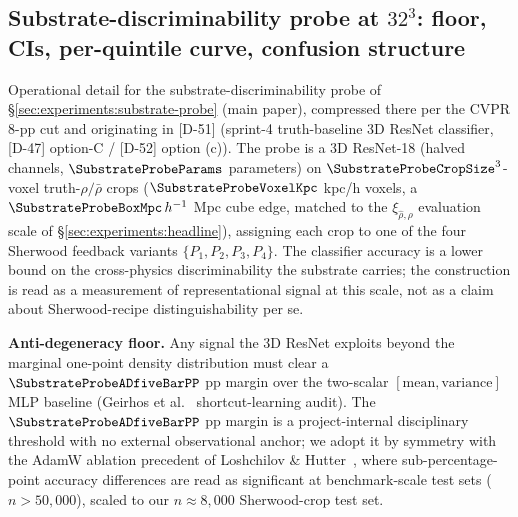 \subsection{Substrate-discriminability probe at $32^3$: floor, CIs, per-quintile curve, confusion structure}
\label{sec:suppl:exp:substrate-probe-32cube}
Operational detail for the substrate-discriminability probe of \S\ref{sec:experiments:substrate-probe} (main paper), compressed there per the CVPR 8-pp cut and originating in [D-51] (sprint-4 truth-baseline 3D ResNet classifier, [D-47] option-C / [D-52] option (c)). The probe is a 3D ResNet-18 (halved channels, $\SubstrateProbeParams$ parameters) on $\SubstrateProbeCropSize^3$-voxel truth-$\rho/\bar\rho$ crops ($\SubstrateProbeVoxelKpc$ kpc/h voxels, a $\SubstrateProbeBoxMpc\,h^{-1}$ Mpc cube edge, matched to the $\xi_{\hat\rho,\rho}$ evaluation scale of \S\ref{sec:experiments:headline}), assigning each crop to one of the four Sherwood feedback variants $\{P_1, P_2, P_3, P_4\}$. The classifier accuracy is a lower bound on the cross-physics discriminability the substrate carries; the construction is read as a measurement of representational signal at this scale, not as a claim about Sherwood-recipe distinguishability per se.

\textbf{Anti-degeneracy floor.} Any signal the 3D ResNet exploits beyond the marginal one-point density distribution must clear a $\SubstrateProbeADfiveBarPP$ pp margin over the two-scalar $[\text{mean}, \text{variance}]$ MLP baseline (Geirhos et al.~\cite{geirhos2020shortcut} shortcut-learning audit). The $\SubstrateProbeADfiveBarPP$ pp margin is a project-internal disciplinary threshold with no external observational anchor; we adopt it by symmetry with the AdamW ablation precedent of Loshchilov \& Hutter~\cite{loshchilov2019adamw}, where sub-percentage-point accuracy differences are read as significant at benchmark-scale test sets ($n\!>\!50{,}000$), scaled to our $n\!\approx\!8{,}000$ Sherwood-crop test set.

